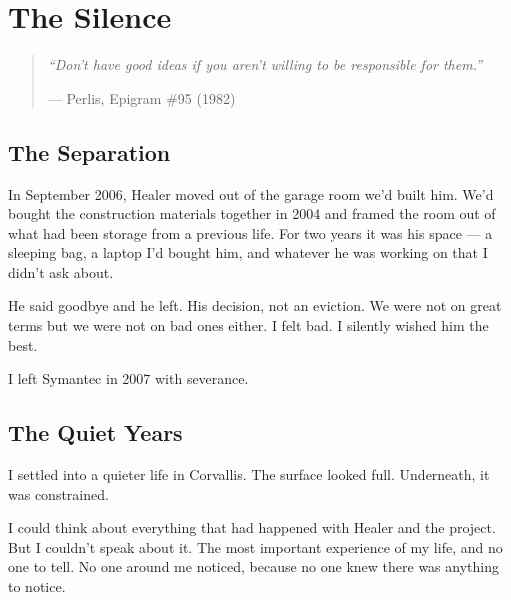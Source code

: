 
\chapter{The Silence}
\label{pos29:the-silence}

\begin{quote}\small\textit{%
``Don't have good ideas if you aren't willing to be responsible for them.''%
}\par\raggedleft --- Perlis, Epigram \#95 (1982)\end{quote}

\vspace{0.5cm}


\section*{The Separation}
\label{pos29:the-separation}

In September 2006, Healer moved out of the garage room we'd built him. We'd bought the construction materials together in 2004 and framed the room out of what had been storage from a previous life. For two years it was his space --- a sleeping bag, a laptop I'd bought him, and whatever he was working on that I didn't ask about.


He said goodbye and he left. His decision, not an eviction. We were not on great terms but we were not on bad ones either. I felt bad. I silently wished him the best.



I left Symantec in 2007 with severance.
\section*{The Quiet Years}
\label{pos29:the-quiet-years}

I settled into a quieter life in Corvallis. The surface looked full. Underneath, it was constrained.

I could think about everything that had happened with Healer and the project. But I couldn't speak about it. The most important experience of my life, and no one to tell. No one around me noticed, because no one knew there was anything to notice.

